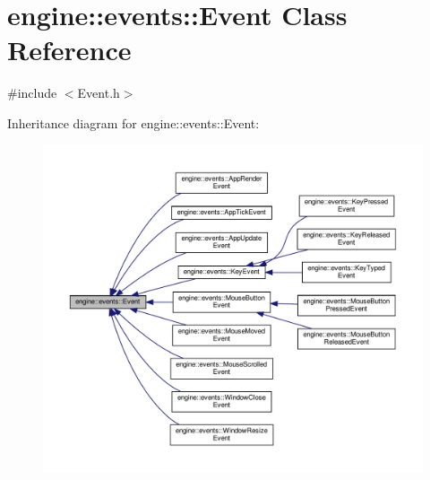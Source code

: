 \hypertarget{classengine_1_1events_1_1Event}{}\section{engine\+:\+:events\+:\+:Event Class Reference}
\label{classengine_1_1events_1_1Event}


{\ttfamily \#include $<$Event.\+h$>$}



Inheritance diagram for engine\+:\+:events\+:\+:Event\+:\nopagebreak
\begin{figure}[H]
\begin{center}
\leavevmode
\includegraphics[width=350pt]{classengine_1_1events_1_1Event__inherit__graph}
\end{center}
\end{figure}
